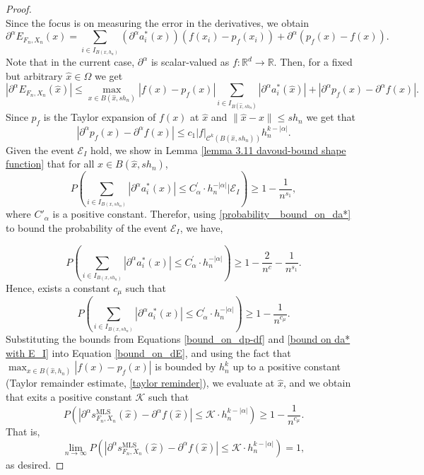 \documentclass{article}
\newcommand{\mlsfunstoch}{s^\text{MLS}_{F_n,X_n}}
\begin{document}
\begin{proof}
$$$$
Since the focus is on measuring the error in the derivatives, we obtain
$$
\partial^\alpha E_{F_n,X_n}(x)=\sum_{i \in I_{B\left(x, h_n\right)}}\left(\partial^\alpha a_i^*(x)\right)\left(f\left(x_i\right)-p_f\left(x_i\right)\right)+\partial^\alpha(p_f(x)-f(x)).
$$
Note that in the current case, $\partial^\alpha$ is scalar-valued as $f: \mathbb{R}^d \rightarrow \mathbb{R}$. Then, for a fixed but arbitrary $\hat{x} \in \Omega$ we get
\begin{equation}
  \left|\partial^\alpha E_{F_n,X_n}(\hat{x})\right| \leq \max _{x \in B(\hat{x},s h_n)}|f(x)-p_f(x)| \sum_{i \in I_{B\left(\hat{x}, s h_n\right)}}\left|\partial^\alpha a_i^*(\hat{x})\right|+\left|\partial^\alpha p_f(x)-\partial^\alpha f(x)\right|.  
  \label{bound_on_dE}
\end{equation}
Since $p_f$ is the Taylor expansion of $f(x)$ at $\hat{x}$ and $\|\hat{x}-x\| \leq sh_n$ we get that
\begin{equation}
    \left|\partial^\alpha p_f(x)-\partial^\alpha f(x)\right| \leq c_1|f|_{\mathcal{C}^k(B(\hat{x},s h_n))}h_n^{k-|\alpha|}.
     \label{bound_on_dp-df}
\end{equation}
Given the event $\mathscr{E}_I$ hold, we show in Lemma \ref{lemma 3.11 davoud-bound shape function} that for all $x \in B(\hat{x},s h_n)$, 
\begin{equation}
    P\left(\sum_{i \in I_{B\left(x, s h_n\right)}}\left|\partial^\alpha a_i^*(x)\right| \leq C_\alpha^{\prime} \cdot h_n^{-|\alpha|}\Big|\mathscr{E}_I\right)\geq 1-\frac{1}{n^{s_1}},
    \label{probability _bound_on_da*}
\end{equation}
where $C'_{\alpha}$ is a positive constant.
Therefor, using \eqref{probability _bound_on_da*} to bound the probability of the event $\mathscr{E}_I$, we have, 

\begin{equation}
    P\left(\sum_{i \in I_{B\left(x, s h_n\right)}}\left|\partial^\alpha a_i^*(x)\right| \leq C_\alpha^{\prime} \cdot h_n^{-|\alpha|}\right)\geq 1-\frac{2}{n^c}-\frac{1}{n^{s_1}}.
    \label{bound on da* with E_I}
\end{equation}
Hence, exists a constant  $c_{\mu}$ such that
\begin{equation}
    P\left(\sum_{i \in I_{B\left(x, s h_n\right)}}\left|\partial^\alpha a_i^*(x)\right| \leq C_\alpha^{\prime}\cdot h_n^{-|\alpha|}\right)\geq 1-\frac{1}{n^{c_\mu}}.
\end{equation}
Substituting the bounds from Equations \eqref{bound_on_dp-df} and \eqref{bound on da* with E_I} into Equation \eqref{bound_on_dE}, and using the fact that $\max_{x \in B(\hat{x},h_n)} |f(x) - p_f(x)|$ is bounded by $h_n^k$ up to a positive constant (Taylor remainder estimate, \eqref{taylor reminder}), we evaluate at $\hat{x}$, and we obtain that exits a positive constant $\mathcal{K}$ such that
$$ 
P\left(\left|\partial^{\alpha} \mlsfunstoch(\hat{x})-\partial^{\alpha} f(\hat{x})\right| \leq\mathcal{K}\cdot h_n^{k-|\alpha|}\right)\geq 1-\frac{1}{n^{c_\mu}}.
$$
That is,
$$ \lim_{n\rightarrow\infty}P\left(\left|\partial^{\alpha} \mlsfunstoch(\hat{x})-\partial^{\alpha} f(\hat{x})\right| \leq\mathcal{K}\cdot h_n^{k-|\alpha|}\right)=1,
$$
as desired. 
\end{proof}
\end{document}
